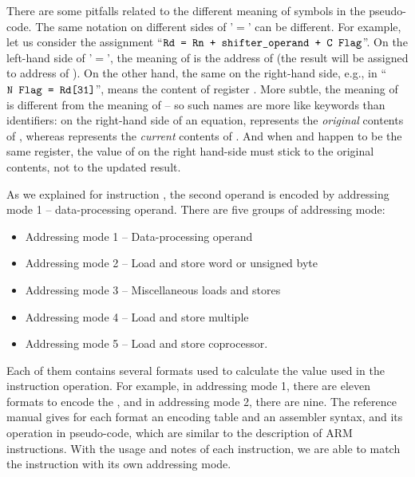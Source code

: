 \newcommand{\Rd}{\armrf{Rd}\xspace}
\newcommand{\Rn}{\armrf{Rn}\xspace}

There are some pitfalls related to the different meaning of symbols in
the pseudo-code.  The same notation on different sides of '$=$' can be
different.  For example, let us consider the assignment 
``$\texttt{Rd = Rn + shifter\_operand + C Flag}$''.
On the left-hand side of '$=$',
the meaning of \Rd is the address of \Rd (the result will be assigned
to address of \Rd).  On the other hand, the same \Rd on the right-hand
side, e.g., in ``$\texttt{N Flag = Rd[31]}$'', means the content of
register \Rd.  More subtle, the meaning of \Rd is different from the
meaning of \Rn -- so such names are more like keywords than
identifiers: on the right-hand side of an equation, \Rn represents the
\emph{original} contents of \Rn, whereas \Rd represents the
\emph{current} contents of \Rd.  And when \Rd and \Rn happen to be the
same register, the value of \Rn on the right hand-side must stick to
the original contents, not to the updated result.

As we explained for instruction \adc, the second operand is encoded by
addressing mode 1 -- data-processing operand.
There are five groups of addressing mode:
\begin{itemize}
\item Addressing mode 1 -- Data-processing operand
\item Addressing mode 2 -- Load and store word or unsigned byte
\item Addressing mode 3 -- Miscellaneous loads and stores
\item Addressing mode 4 -- Load and store multiple
\item Addressing mode 5 -- Load and store coprocessor.
\end{itemize}

Each of them contains several formats used to calculate the value used
in the instruction operation.  For example, in addressing mode 1,
there are eleven formats to encode the , and in
addressing mode 2, there are nine.  The reference manual gives for
each format an encoding table and an assembler syntax, and its
operation in pseudo-code, which are similar to the description of ARM
instructions. With the usage and notes of each instruction, we are
able to match the instruction with its own addressing mode.

